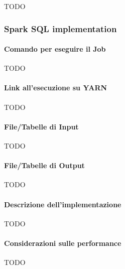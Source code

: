   TODO

  \subsubsection{Spark SQL implementation}\label{subsub:job1:spark}

  \paragraph{Comando per eseguire il Job}\label{par:job1:spark:cmd}

  TODO

  \paragraph{Link all’esecuzione su YARN}\label{par:job1:spark:yarn}

  TODO

  \paragraph{File/Tabelle di Input}\label{par:job1:spark:input}

  TODO

  \paragraph{File/Tabelle di Output}\label{par:job1:spark:output}

  TODO

  \paragraph{Descrizione dell’implementazione}\label{par:job1:spark:implementation}

  TODO

  \paragraph{Considerazioni sulle performance}\label{par:job1:spark:performance}

  TODO
